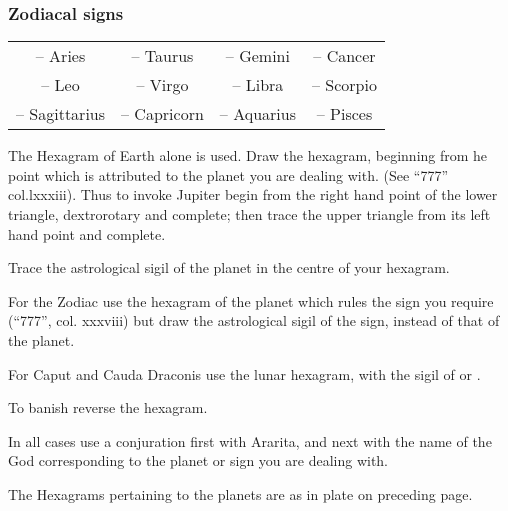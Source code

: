 \subsubsection*{Zodiacal signs}
\begin{center}
\begin{tabular}{c c c c}
\Aries{} -- Aries & \Taurus{} -- Taurus & \Gemini{} -- Gemini & \Cancer{} -- Cancer \\
\Leo{} -- Leo & \Virgo{} -- Virgo & \Libra{} -- Libra & \Scorpio{} -- Scorpio \\
\Sagittarius{} -- Sagittarius & \Capricorn{}\footnotemark -- Capricorn & \Aquarius{} -- Aquarius & \Pisces{} -- Pisces
\end{tabular}
\end{center}


The Hexagram of Earth alone is used. Draw the hexagram, beginning from he point which is attributed to the planet you are dealing with. (See \enquote{777} col.lxxxiii). Thus to invoke Jupiter begin from the right hand point of the lower triangle, dextrorotary and complete; then trace the upper triangle from its left hand point and complete.

Trace the astrological sigil of the planet in the centre of your hexagram.

For the Zodiac use the hexagram of the planet which rules the sign you require (\enquote{777}, col. xxxviii) but draw the astrological sigil of the sign, instead of that of the planet.

For Caput and Cauda Draconis use the lunar hexagram, with the sigil of \rahu{} or \rahur{}.

To banish reverse the hexagram.

In all cases use a conjuration first with Ararita, and next with the name of the God corresponding to the planet or sign you are dealing with.

The Hexagrams pertaining to the planets are as in plate on preceding page.

